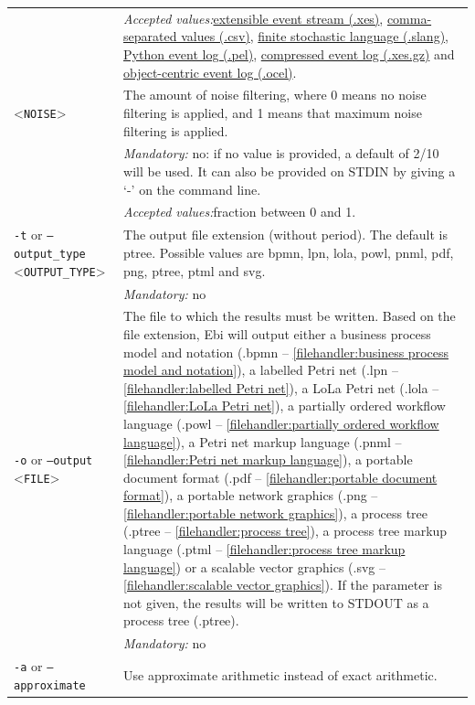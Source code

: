 {\begin{tabularx}{\linewidth}{lX}
&\textit{Accepted values:}\quad \hyperref[filehandler:extensible event stream]{extensible event stream (.xes)}, \hyperref[filehandler:comma-separated values]{comma-separated values (.csv)}, \hyperref[filehandler:finite stochastic language]{finite stochastic language (.slang)}, \hyperref[filehandler:Python event log]{Python event log (.pel)}, \hyperref[filehandler:compressed event log]{compressed event log (.xes.gz)} and \hyperref[filehandler:object-centric event log]{object-centric event log (.ocel)}.\\
<\texttt{NOISE}>&The amount of noise filtering, where 0 means no noise filtering is applied, and 1 means that maximum noise filtering is applied.\\
&\textit{Mandatory:} \quad no: if no value is provided, a default of 2/10 will be used. It can also be provided on STDIN by giving a `-' on the command line.\\
&\textit{Accepted values:}\quad fraction between 0 and 1.\\
\texttt{-t} or \texttt{--output\_type} <\texttt{OUTPUT\_TYPE}> &
The output file extension (without period). The default is ptree. Possible values are bpmn, lpn, lola, powl, pnml, pdf, png, ptree, ptml and svg.\\
&\textit{Mandatory:} \quad no\\
\texttt{-o} or \texttt{--output} <\texttt{FILE}> &
The file to which the results must be written. Based on the file extension, Ebi will output either a business process model and notation (.bpmn -- \cref{filehandler:business process model and notation}), a labelled Petri net (.lpn -- \cref{filehandler:labelled Petri net}), a LoLa Petri net (.lola -- \cref{filehandler:LoLa Petri net}), a partially ordered workflow language (.powl -- \cref{filehandler:partially ordered workflow language}), a Petri net markup language (.pnml -- \cref{filehandler:Petri net markup language}), a portable document format (.pdf -- \cref{filehandler:portable document format}), a portable network graphics (.png -- \cref{filehandler:portable network graphics}), a process tree (.ptree -- \cref{filehandler:process tree}), a process tree markup language (.ptml -- \cref{filehandler:process tree markup language}) or a scalable vector graphics (.svg -- \cref{filehandler:scalable vector graphics}).
If the parameter is not given, the results will be written to STDOUT as a process tree (.ptree).\\
&\textit{Mandatory:} \quad no\\
\texttt{-a} or \texttt{--approximate} & Use approximate arithmetic instead of exact arithmetic.\\

\end{tabularx}}
